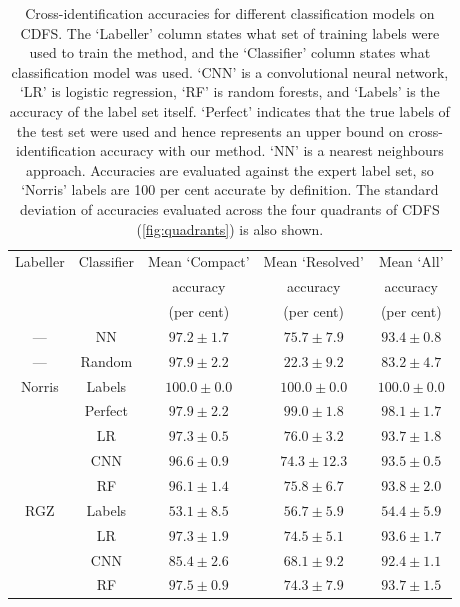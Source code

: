   \begin{table}
    \caption[Cross-identification accuracies for different classification
    models on CDFS.]{Cross-identification accuracies for different classification
    models on CDFS. The `Labeller' column states what set of training labels
    were used to train the method, and the `Classifier' column states what
    classification model was used. `CNN' is a convolutional neural network,
    `LR' is logistic regression, `RF' is random forests, and `Labels' is the
    accuracy of the label set itself. `Perfect' indicates that the true labels
    of the test set were used and hence represents an upper bound on
    cross-identification accuracy with our method. `NN' is a
    nearest neighbours approach. Accuracies are evaluated against the expert
    label set, so `Norris' labels are 100 per cent accurate by definition. The
    standard deviation of accuracies evaluated across the four quadrants of
    CDFS (\autoref{fig:quadrants}) is also shown.}
    \label{tab:cdfs-acc}
    \small\centering
    \begingroup
    \setlength{\tabcolsep}{8pt} %
    \begin{tabular}{ccccc}
      \hline\hline
      Labeller & Classifier & Mean `Compact' & Mean `Resolved' & Mean `All'\\
       &  & accuracy & accuracy & accuracy\\
       &  & (per cent) & (per cent) & (per cent)\\
      \hline
     ---& NN & $97.2 \pm 1.7$ & $75.7 \pm 7.9$ & $93.4 \pm 0.8$\\
     ---& Random & $97.9 \pm 2.2$ & $22.3 \pm 9.2$ & $83.2 \pm 4.7$\\
      Norris & Labels & $100.0 \pm 0.0$ & $100.0 \pm 0.0$ & $100.0 \pm 0.0$\\
             & Perfect & $97.9 \pm 2.2$ & $99.0 \pm 1.8$ & $98.1 \pm 1.7$\\
             & LR & $97.3 \pm 0.5$ & $76.0 \pm 3.2$ & $93.7 \pm 1.8$\\
             & CNN & $96.6 \pm 0.9$ & $74.3 \pm 12.3$ & $93.5 \pm 0.5$\\
             & RF & $96.1 \pm 1.4$ & $75.8 \pm 6.7$ & $93.8 \pm 2.0$\\
      RGZ & Labels & $53.1 \pm 8.5$ & $56.7 \pm 5.9$ & $54.4 \pm 5.9$\\
          & LR & $97.3 \pm 1.9$ & $74.5 \pm 5.1$ & $93.6 \pm 1.7$\\
          & CNN & $85.4 \pm 2.6$ & $68.1 \pm 9.2$ & $92.4 \pm 1.1$\\
          & RF & $97.5 \pm 0.9$ & $74.3 \pm 7.9$ & $93.7 \pm 1.5$\\
      \hline\hline
    \end{tabular}
    \endgroup
  \end{table}

